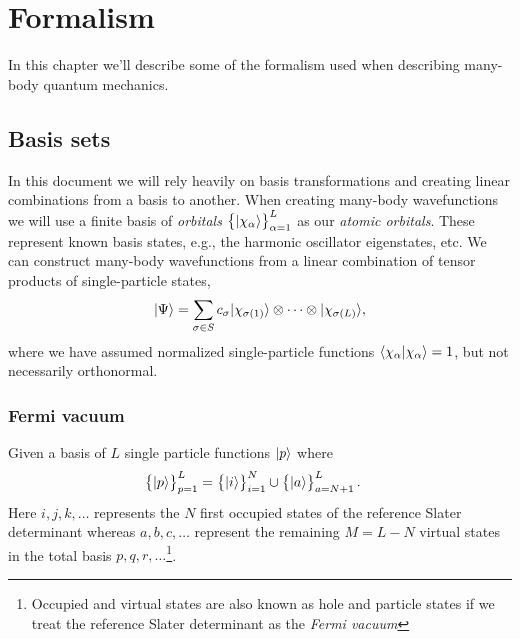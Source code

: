 \chapter{Formalism}
    In this chapter we'll describe some of the formalism used when describing
    many-body quantum mechanics.

    \section{Basis sets}
        In this document we will rely heavily on basis transformations and
        creating linear combinations from a basis to another. When creating
        many-body wavefunctions we will use a finite basis of \emph{orbitals}
        $\left\{ | \chi_{\alpha} \rangle \right\}_{\alpha = 1}^{L}$ as our \emph{atomic
        orbitals}. These represent known basis states, e.g., the harmonic
        oscillator eigenstates, etc. We can construct many-body wavefunctions
        from a linear combination of tensor products of single-particle states,
        \begin{align}
            | \Psi \rangle
            = \sum_{\sigma \in S} c_{\sigma}
            | \chi_{\sigma(1)} \rangle\otimes\dots\otimes| \chi_{\sigma(L)} \rangle,
        \end{align}
        where we have assumed normalized single-particle functions
        $\langle \chi_{\alpha} | \chi_{\alpha} \rangle = 1$, but not necessarily
        orthonormal.

        \subsection{Fermi vacuum}
            \label{sec:fermi-vacuum}
            Given a basis of $L$ single particle functions $| p \rangle$ where
            \begin{align}
                \left\{| p \rangle\right\}_{p = 1}^{L}
                &=
                \left\{| i \rangle\right\}_{i = 1}^{N}
                \cup \left\{| a \rangle\right\}_{a = N + 1}^{L}.
            \end{align}
            Here $i, j, k, \dots$ represents the $N$ first occupied states of
            the reference Slater determinant whereas $a, b, c, \dots$ represent
            the remaining $M = L - N$ virtual states in the total basis $p, q,
            r, \dots$\footnote{Occupied and virtual states are also known as
            hole and particle states if we treat the reference Slater
            determinant as the \textit{Fermi vacuum}}.

